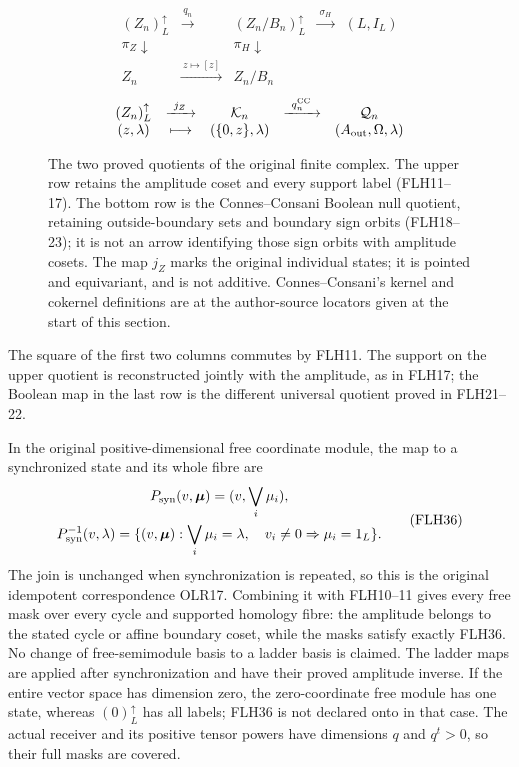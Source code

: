 \begin{figure}[ht]
\centering
\[
\begin{array}{ccccc}
(Z_n)_L^\uparrow &\xrightarrow{\ q_n\ }&
(Z_n/B_n)_L^\uparrow&\xrightarrow{\ \sigma_H\ }&(L,I_L)\\
\pi_Z\downarrow&&\pi_H\downarrow&&\\
Z_n&\xrightarrow{\ z\mapsto[z]\ }&Z_n/B_n&&
\end{array}
\]
\[
\begin{array}{ccccc}
(Z_n)_L^\uparrow&\xrightarrow{\ j_Z\ }&
\mathcal K_n&\xrightarrow{\ q_n^{\rm CC}\ }&
\mathcal Q_n\\
(z,\lambda)&\longmapsto&
(\{0,z\},\lambda)&& (A_{\rm out},\Omega,\lambda)
\end{array}
\]
\caption{The two proved quotients of the original finite complex.
The upper row retains the amplitude coset and every support label
(FLH11--17). The bottom row is the Connes--Consani Boolean null
quotient, retaining outside-boundary sets and boundary sign orbits
(FLH18--23); it is not an arrow identifying those sign orbits with
amplitude cosets. The map \(j_Z\) marks the original individual
states; it is pointed and equivariant, and is not additive.
Connes--Consani's
kernel and cokernel definitions are at the author-source locators
given at the start of this section.}
\label{fig:FLH-joint}
\end{figure}

The square of the first two columns commutes by FLH11.
The support on the upper quotient is reconstructed jointly
with the amplitude, as in FLH17; the Boolean map in the last
row is the different universal quotient proved in FLH21--22.

In the original positive-dimensional free coordinate module,
the map to a synchronized state and its whole fibre are
\[
\begin{gathered}
P_{\rm syn}(v,\boldsymbol\mu)
       =(v,\bigvee_i\mu_i),\\
P_{\rm syn}^{-1}(v,\lambda)
 =\{(v,\boldsymbol\mu):
       \bigvee_i\mu_i=\lambda,\quad
       v_i\ne0\Rightarrow\mu_i=1_L\}.
\end{gathered}\tag{FLH36}
\]
The join is unchanged when synchronization is repeated,
so this is the original idempotent correspondence OLR17.
Combining it with FLH10--11 gives every free mask over every
cycle and supported homology fibre: the amplitude belongs
to the stated cycle or affine boundary coset, while the masks
satisfy exactly FLH36. No change of free-semimodule basis
to a ladder basis is claimed. The ladder maps are applied
after synchronization and have their proved amplitude inverse.
If the entire vector space has dimension zero, the zero-coordinate
free module has one state, whereas \((0)_L^\uparrow\) has
all labels; FLH36 is not declared onto in that case.
The actual receiver and its positive tensor powers have
dimensions \(q\) and \(q^t>0\), so their full masks are covered.

